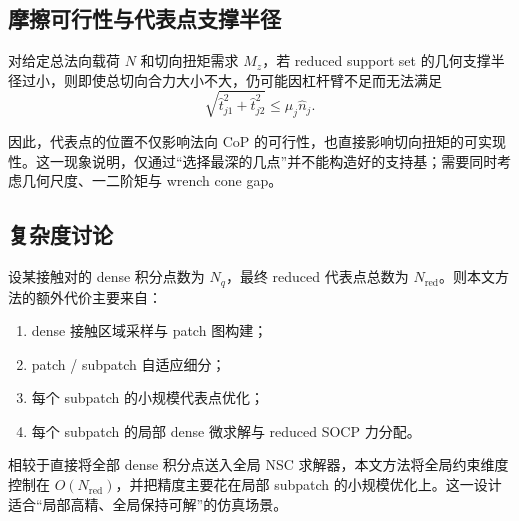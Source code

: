 \subsection{摩擦可行性与代表点支撑半径}

对给定总法向载荷 $N$ 和切向扭矩需求 $M_z$，若 reduced support set 的几何支撑半径过小，则即使总切向合力大小不大，仍可能因杠杆臂不足而无法满足
\begin{equation}
\sqrt{\hat{t}_{j1}^2+\hat{t}_{j2}^2}\le \mu_j\hat{n}_j.
\end{equation}

因此，代表点的位置不仅影响法向 CoP 的可行性，也直接影响切向扭矩的可实现性。这一现象说明，仅通过“选择最深的几点”并不能构造好的支持基；需要同时考虑几何尺度、一二阶矩与 wrench cone gap。

\subsection{复杂度讨论}

设某接触对的 dense 积分点数为 $N_q$，最终 reduced 代表点总数为 $N_{\mathrm{red}}$。则本文方法的额外代价主要来自：
\begin{enumerate}[label=(\arabic*)]
    \item dense 接触区域采样与 patch 图构建；
    \item patch / subpatch 自适应细分；
    \item 每个 subpatch 的小规模代表点优化；
    \item 每个 subpatch 的局部 dense 微求解与 reduced SOCP 力分配。
\end{enumerate}

相较于直接将全部 dense 积分点送入全局 NSC 求解器，本文方法将全局约束维度控制在 $O(N_{\mathrm{red}})$，并把精度主要花在局部 subpatch 的小规模优化上。这一设计适合“局部高精、全局保持可解”的仿真场景。
